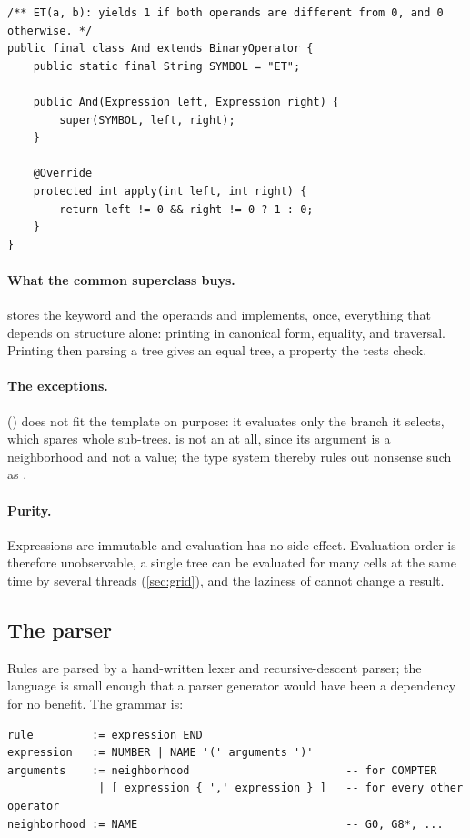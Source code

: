 \begin{lstlisting}
/** ET(a, b): yields 1 if both operands are different from 0, and 0 otherwise. */
public final class And extends BinaryOperator {
    public static final String SYMBOL = "ET";

    public And(Expression left, Expression right) {
        super(SYMBOL, left, right);
    }

    @Override
    protected int apply(int left, int right) {
        return left != 0 && right != 0 ? 1 : 0;
    }
}
\end{lstlisting}

\paragraph{What the common superclass buys.}  stores the keyword and the operands
and implements, once, everything that depends on structure alone: printing in canonical form,
equality, and traversal. Printing then parsing a tree gives an equal tree, a property the tests
check.

\paragraph{The exceptions.}  () does not fit the template on purpose:
it evaluates only the branch it selects, which spares whole sub-trees.  is not an
 at all, since its argument is a neighborhood and not a value; the type system
thereby rules out nonsense such as .

\paragraph{Purity.} Expressions are immutable and evaluation has no side effect. Evaluation
order is therefore unobservable, a single tree can be evaluated for many cells at the same time
by several threads (\cref{sec:grid}), and the laziness of  cannot change a result.

\subsection{The parser}

Rules are parsed by a hand-written lexer and recursive-descent parser; the language is small
enough that a parser generator would have been a dependency for no benefit. The grammar is:

\begin{lstlisting}[style=text]
rule         := expression END
expression   := NUMBER | NAME '(' arguments ')'
arguments    := neighborhood                        -- for COMPTER
              | [ expression { ',' expression } ]   -- for every other operator
neighborhood := NAME                                -- G0, G8*, ...
\end{lstlisting}


